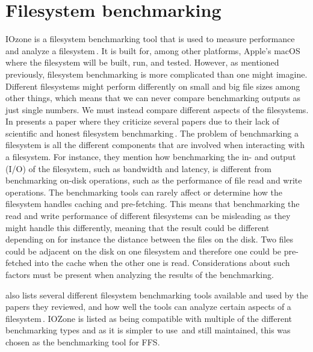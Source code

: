 \section{Filesystem benchmarking}
IOzone is a filesystem benchmarking tool that is used to measure performance and analyze a filesystem\,\cite{IozoneFilesystemBenchmark}. It is built for, among other platforms, Apple's macOS where the filesystem will be built, run, and tested. However, as mentioned previously, filesystem benchmarking is more complicated than one might imagine. Different filesystems might perform differently on small and big file sizes among other things, which means that we can never compare benchmarking outputs as just single numbers. We must instead compare different aspects of the filesystems. In \citeyear{tarasovBenchmarkingFileSystem2011} \citeauthor{tarasovBenchmarkingFileSystem2011} presents a paper where they criticize several papers due to their lack of scientific and honest filesystem benchmarking\,\cite{tarasovBenchmarkingFileSystem2011}. The problem of benchmarking a filesystem is all the different components that are involved when interacting with a filesystem. For instance, they mention how benchmarking the in- and output (I/O) of the filesystem, such as bandwidth and latency, is different from benchmarking on-disk operations, such as the performance of file read and write operations. The benchmarking tools can rarely affect or determine how the filesystem handles caching and pre-fetching. This means that benchmarking the read and write performance of different filesystems can be misleading as they might handle this differently, meaning that the result could be different depending on for instance the distance between the files on the disk. Two files could be adjacent on the disk on one filesystem and therefore one could be pre-fetched into the cache when the other one is read. Considerations about such factors must be present when analyzing the results of the benchmarking.

\citeauthor{tarasovBenchmarkingFileSystem2011} also lists several different filesystem benchmarking tools available and used by the papers they reviewed, and how well the tools can analyze certain aspects of a filesystem\,\cite{tarasovBenchmarkingFileSystem2011}. IOZone is listed as being compatible with multiple of the different benchmarking types and as it is simpler to use\,\cite{agarwalComparingIOBenchmarks2018} and still maintained, this was chosen as the benchmarking tool for FFS.